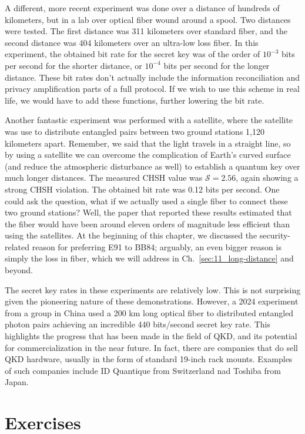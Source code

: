 A different, more recent experiment was done over a distance of hundreds of kilometers, but in a lab over optical fiber wound around a spool.  Two distances were tested.
The first distance was 311 kilometers over standard fiber, and the second distance was 404 kilometers over an ultra-low loss fiber.
In this experiment, the obtained bit rate for the secret key was of the order of $10^{-3}$ bits per second for the shorter distance, or $10^{-4}$ bits per second for the longer distance. These bit rates don't actually include the information reconciliation and privacy amplification parts of a full protocol.
If we wish to use this scheme in real life, we would have to add these functions, further lowering the bit rate.

Another fantastic experiment was performed with a satellite, where the satellite was use to distribute entangled pairs between two ground stations 1,120 kilometers apart.
Remember, we said that the light travels in a straight line, so by using a satellite we can overcome the complication of Earth's curved surface (and reduce the atmospheric disturbance as well) to establish a quantum key over much longer distances.
The measured CHSH value was $\mathcal{S} = 2.56$, again showing a strong CHSH violation.
The obtained bit rate was 0.12 bits per second.
One could ask the question, what if we actually used a single fiber to connect these two ground stations?
Well, the paper that reported these results estimated that the fiber would have been around eleven orders of magnitude less efficient than using the satellites.
At the beginning of this chapter, we discussed the security-related reason for preferring E91 to BB84; arguably, an even bigger reason is simply the loss in fiber, which we will address in Ch.~\ref{sec:11_long-distance} and beyond.

The secret key rates in these experiments are relatively low.
This is not surprising given the pioneering nature of these demonstrations.
However, a 2024 experiment from a group in China used a 200 km long optical fiber to distributed entangled photon pairs achieving an incredible 440 bits/second secret key rate.
This highlights the progress that has been made in the field of QKD, and its potential for commercialization in the near future.
In fact, there are companies that do sell QKD hardware, usually in the form of standard 19-inch rack mounts.
Examples of such companies include ID Quantique from Switzerland nad Toshiba from Japan.


\newpage
\section{Exercises}

